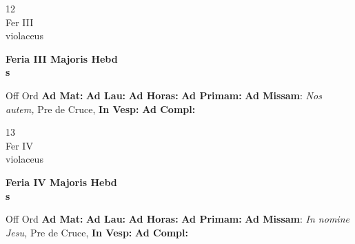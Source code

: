 \documentclass[10pt, openany]{book}
\begin{document}
    \begin{center}
        \begin{minipage}{3.5in}
            \vspace{2em}
            \begin{minipage}{0.5in}
                {\Huge 12} \\
                {\normalsize Fer III} \\
                {\normalsize violaceus}
            \end{minipage}
            \begin{minipage}{3.0in}
                \textbf{ \large Feria III Majoris Hebd \\
                \textnormal{\normalsize s}} \\ 
            \end{minipage}
            \begin{justify}Off Ord
                \textbf{Ad Mat: }
                \textbf{Ad Lau: }
                \textbf{Ad Horas: }
                \textbf{Ad Primam: }\textbf{Ad Missam}: \textit{Nos autem,} Pre de Cruce,  
                \textbf{In Vesp: }
                \textbf{Ad Compl: }
            \end{justify}
        \end{minipage}
    \end{center}

    \begin{center}
        \begin{minipage}{3.5in}
            \vspace{2em}
            \begin{minipage}{0.5in}
                {\Huge 13} \\
                {\normalsize Fer IV} \\
                {\normalsize violaceus}
            \end{minipage}
            \begin{minipage}{3.0in}
                \textbf{ \large Feria IV Majoris Hebd \\
                \textnormal{\normalsize s}} \\ 
            \end{minipage}
            \begin{justify}Off Ord
                \textbf{Ad Mat: }
                \textbf{Ad Lau: }
                \textbf{Ad Horas: }
                \textbf{Ad Primam: }\textbf{Ad Missam}: \textit{In nomine Jesu,} Pre de Cruce,  
                \textbf{In Vesp: }
                \textbf{Ad Compl: }
            \end{justify}
        \end{minipage}
    \end{center}
\end{document}
